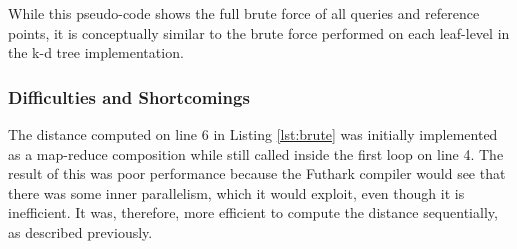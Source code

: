 While this pseudo-code shows the full brute force of all queries and reference points, it is conceptually similar to the brute force performed on each leaf-level in the k-d tree implementation. 


\subsubsection{Difficulties and Shortcomings}

The distance computed on line 6 in Listing \ref{lst:brute} was initially implemented as a map-reduce composition while still called inside the first loop on line 4. The result of this was poor performance because the Futhark compiler would see that there was some inner parallelism, which it would exploit, even though it is inefficient. It was, therefore, more efficient to compute the distance sequentially, as described previously. 


























